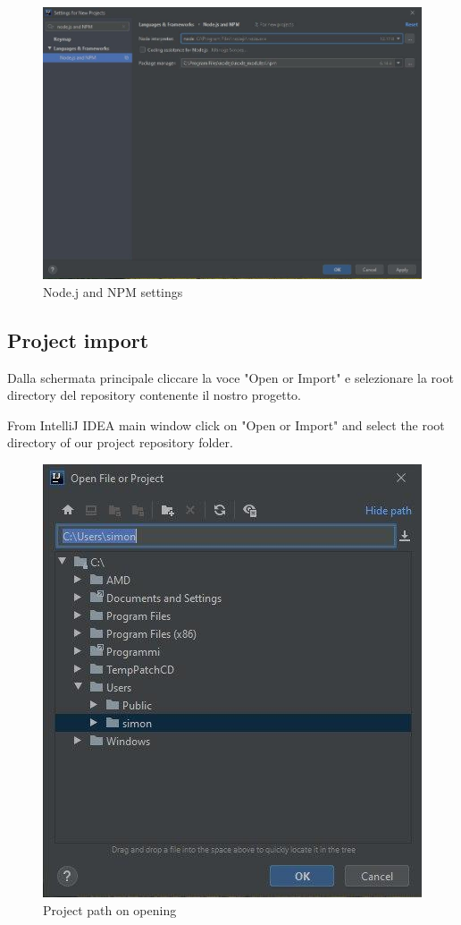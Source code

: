 \begin{figure}[H]
		\centering
		\includegraphics[scale=0.60]{../Developer_manual/img/nodejs_and_npm.jpg}
		\caption{Node.j and NPM settings}
	\end{figure}	

	\subsection{Project import}
	Dalla schermata principale cliccare la voce "Open or Import" e selezionare la root directory del repository contenente il nostro progetto.

	From IntelliJ IDEA main window click on "Open or Import" and select the root directory of our project repository folder.

\begin{figure}[H]
		\centering
		\includegraphics[scale=0.80]{../Developer_manual/img/open_project.jpg}
		\caption{Project path on opening}
	\end{figure}	


